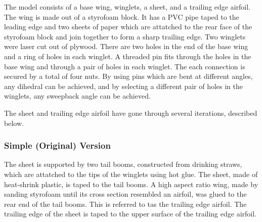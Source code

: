 \documentclass[12pt]{report} %
\begin{document}
The model consists of a base wing, winglets, a sheet, and a trailing edge airfoil.  The wing is made out of a styrofoam block.
 It has a PVC pipe taped to the leading edge and two sheets of paper which are attatched to the rear face of the styrofoam
block and join together to form a sharp trailing edge.  Two winglets were laser cut out of plywood.  There are two holes in the end of
the base wing and a ring of holes in each winglet.  A threaded pin fits through the holes in the base wing and through a pair of holes
in each winglet.  The each connection is secured by a total of four nuts.  By using pins which are bent at different angles, any dihedral
can be achieved, and by selecting a different pair of holes in the winglets, any sweepback angle can be achieved.

The sheet and trailing edge airfoil have gone through several iterations, described below.

\subsubsection{Simple (Original) Version}
The sheet is supported by two tail booms, constructed from drinking straws, which are attatched to the tips of the winglets using hot
glue.  The sheet, made of heat-shrink plastic, is taped to the tail booms.  A high aspect ratio wing, made by sanding styrofoam until
its cross section resembled an airfoil, was glued to the rear end of the tail booms.  This is referred to tas the trailing edge airfoil.
 The trailing edge of the sheet is taped to the upper surface of the trailing edge airfoil.
\end{document}

